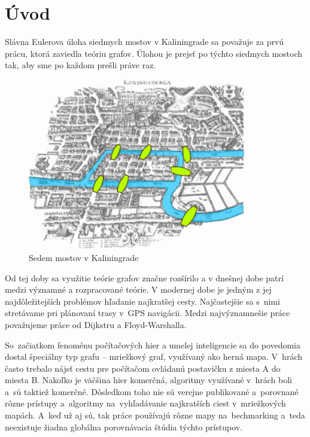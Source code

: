 \chapter*{Úvod}

Slávna Eulerova úloha siedmych mostov v Kaliningrade \cite{euler41} sa považuje za prvú prácu, 
ktorá zaviedla teóriu grafov.
Úlohou je prejsť po týchto siedmych mostoch tak, aby sme po každom prešli práve raz.


\begin{figure}[h]
\centering
\includegraphics[height=7.5cm]{./img/Konigsberg_bridges.png}
\caption{Sedem mostov v Kaliningrade}
\label{fig:konigsberg_bridges}
\end{figure}


 
Od tej doby sa využitie teórie grafov značne
rozšírilo a v dnešnej dobe patrí medzi významné
a rozpracované teórie. V modernej dobe je jedným z jej 
najdôležitejších problémov hľadanie najkratšej cesty. Najčastejšie sa s~nimi stretávame pri plánovaní trasy v~GPS navigácii.
Medzi najvýznamnešie práce považujeme práce od Dijkstru \cite{dijkstra59} a Floyd-Warshalla.

So~začiatkom fenoménu počítačových hier 
a umelej inteligencie sa do povedomia dostal špeciálny typ grafu --
mriežkový graf, využívaný ako herná mapa.
V~hrách často trebalo nájsť cestu pre počítačom
ovládanú postavičku z miesta A do miesta B.
Nakoľko je väčšina hier komerčná, algoritmy
využívané v~hrách boli a~sú taktiež komerčné.
Dôsledkom toho nie sú verejne publikované a~porovnané rôzne prístupy a~algoritmy
na~vyhľadávanie najkratších ciest v~mriežkových mapách. A~keď už aj sú, tak práce používajú rôzne mapy
na~bechmarking a~teda neexistuje žiadna globálna porovnávacia štúdia týchto prístupov.

